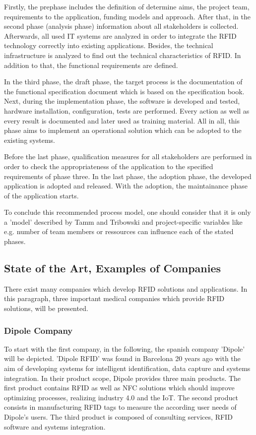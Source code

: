 Firstly, the prephase includes the definition of determine aims, the project team, requirements to the application, funding models and approach. After that, in the second phase (analysis phase) information about all stakeholders is collected. Afterwards, all used IT systems are analyzed in order to integrate the RFID technology correctly into existing applications. Besides, the technical infrastructure is analyzed to find out the technical characteristics of RFID. In addition to that, the functional requirements are defined.

In the third phase, the draft phase, the target process is the documentation of the functional specification document which is based on the specification book. Next, during the implementation phase, the software is developed and tested, hardware installation, configuration, tests are performed. Every action as well as every result is documented and later used as training material. All in all, this phase aims to implement an operational solution which can be adopted to the existing systems. 

Before the last phase, qualification measures for all stakeholders are performed in order to check the appropriateness of the application to the specified requirements of phase three.
In the last phase, the adoption phase, the developed application is adopted and released. With the adoption, the maintainance phase of the application starts.

To conclude this recommended process model, one should consider that it is only a 'model' described by Tamm and Tribowski \cite[p.59 ff.]{fokus}and project-specific variables like e.g. number of team members or ressources can influence each of the stated phases.

\subsection{State of the Art, Examples of Companies}

There exist many companies which develop RFID solutions and applications. In this paragraph, three important medical companies which provide RFID solutions, will be presented.

\subsubsection{Dipole Company}

To start with the first company, in the following, the spanish company 'Dipole' \cite{dipole} will be depicted. 'Dipole RFID' was found in Barcelona 20 years ago with the aim of developing systems for intelligent identification, data capture and systems integration. In their product scope, Dipole provides three main products. The first product contains RFID as well as \ac{NFC} solutions which should improve optimizing processes, realizing industry 4.0 and the IoT. The second product consists in manufacturing RFID tags to measure the according user needs of Dipole's users. The third product is composed of consulting services, RFID software and systems integration.

